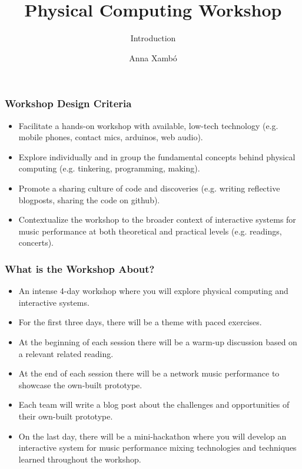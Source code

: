 \documentclass[screen, aspectratio=43]{beamer}
\title[PCW-d1]{Physical Computing Workshop}
\subtitle{Introduction}
\author[A. Xamb{\'o}]{Anna Xamb{\'o}}
\institute[NTNU]{Department of Music, NTNU}
\begin{document}
\begin{frame}
  \titlepage
\end{frame}


\begin{frame}
\frametitle{Workshop Design Criteria}
\begin{itemize}
\item Facilitate a hands-on workshop with available, low-tech technology (e.g. mobile phones, contact mics, arduinos, web audio).
\item Explore individually and in group the fundamental concepts behind physical computing (e.g. tinkering, programming, making).
\item Promote a sharing culture of code and discoveries (e.g. writing reflective blogposts, sharing the code on github).
\item Contextualize the workshop to the broader context of interactive systems for music performance at both theoretical and practical levels (e.g. readings, concerts).
\end{itemize}
\end{frame}
%
\begin{frame}
\frametitle{What is the Workshop About?}
\begin{itemize}
\item An intense 4-day workshop where you will explore physical computing and interactive systems.
\item For the first three days, there will be a theme with paced exercises.
\item At the beginning of each session there will be a warm-up discussion based on a relevant related reading.
\item At the end of each session there will be a network music performance to showcase the own-built prototype.
\item Each team will write a blog post about the challenges and opportunities of their own-built prototype.
\item On the last day, there will be a mini-hackathon where you will develop an interactive system for music performance mixing technologies and techniques learned throughout the workshop.
\end{itemize}
\end{frame}
%
\end{document}
